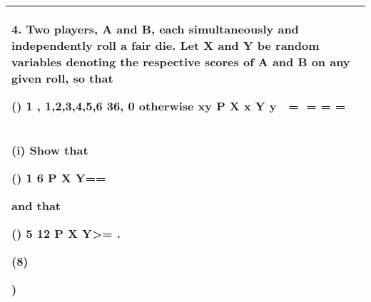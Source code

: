 \documentclass[a4paper,12pt]{article}
\begin{document}
\begin{table}[ht!]
     \centering
     \begin{tabular}{|p{15cm}|}
     \hline        
4. Two players, A and B, each simultaneously and independently roll a fair die.  Let X and Y be random variables denoting the respective scores of A and B on any given roll, so that 
 
  () 1
, 1,2,3,4,5,6
36,
0 otherwise
xy
P X x Y y
 = = = =   
 
 
 
(i) Show that 
 
  () 1 6 P X Y==
 
 
and that 
 
   () 5 12 P X Y>=  . 
 
(8) 
 
) \\ \hline
      \end{tabular}
    \end{table}
\end{document}

